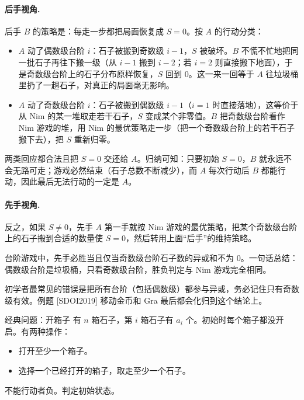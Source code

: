 \paragraph{后手视角.} 后手 $B$ 的策略是：每走一步都把局面恢复成 $S=0$。按 $A$ 的行动分类：
\begin{itemize}
\item $A$ 动了偶数级台阶 $i$：石子被搬到奇数级 $i-1$，$S$ 被破坏。$B$ 不慌不忙地把同一批石子再往下搬一级（从 $i-1$ 搬到 $i-2$；若 $i=2$ 则直接搬下地面），于是奇数级台阶上的石子分布原样恢复，$S$ 回到 $0$。这一来一回等于 $A$ 往垃圾桶里扔了一趟石子，对真正的局面毫无影响。
\item $A$ 动了奇数级台阶 $i$：石子被搬到偶数级 $i-1$（$i=1$ 时直接落地），这等价于从 Nim 的某一堆取走若干石子，$S$ 变成某个非零值。$B$ 把奇数级台阶看作 Nim 游戏的堆，用 Nim 的最优策略走一步（把一个奇数级台阶上的若干石子搬下去），把 $S$ 重新归零。
\end{itemize}
两类回应都合法且把 $S=0$ 交还给 $A$。归纳可知：只要初始 $S=0$，$B$ 就永远不会无路可走；游戏必然结束（石子总数不断减少），而 $A$ 每次行动后 $B$ 都能行动，因此最后无法行动的一定是 $A$。

\paragraph{先手视角.} 反之，如果 $S\ne0$，先手 $A$ 第一手就按 Nim 游戏的最优策略，把某个奇数级台阶上的石子搬到合适的数量使 $S=0$，然后转用上面“后手”的维持策略。

\begin{theorem}[阶梯 Nim 判定]\label{thm:stairnim}
台阶游戏中，先手必胜当且仅当奇数级台阶石子数的异或和不为 $0$。一句话总结：偶数级台阶是垃圾桶，只看奇数级台阶，胜负判定与 Nim 游戏完全相同。
\end{theorem}

\begin{pitfall}[只有奇数级参与异或]
初学者最常见的错误是把所有台阶（包括偶数级）都参与异或，务必记住只有奇数级有效。例题 [SDOI2019] 移动金币和 Gra 最后都会化归到这个结论上。
\end{pitfall}

\begin{problem}{经典问题：开箱子}
有 $n$ 箱石子，第 $i$ 箱石子有 $a_i$ 个。初始时每个箱子都没开启。有两种操作：
\begin{itemize}
\item 打开至少一个箱子。
\item 选择一个已经打开的箱子，取走至少一个石子。
\end{itemize}
不能行动者负。判定初始状态。
\end{problem}

